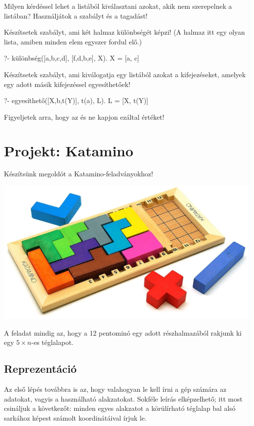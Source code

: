 \begin{problem}
Milyen kérdéssel lehet a  listából
kiválasztani azokat, akik nem szerepelnek a
 listában? Használjátok a
 szabályt és a tagadást!
\end{problem}
\begin{problem}
Készítsetek szabályt, ami két halmaz különbségét
képzi! (A halmaz itt egy olyan lista, amiben minden
elem egyszer fordul elő.)
\begin{query}
?- különbség([a,b,c,d], [f,d,b,e], X).
X = [a, c]
\end{query}
\end{problem}
\begin{problem}
Készítsetek szabályt, ami kiválogatja egy listából
azokat a kifejezéseket, amelyek egy adott másik
kifejezéssel egyesíthetőek!
\begin{query}
?- egyesíthető([X,b,t(Y)], t(a), L).
L = [X, t(Y)]
\end{query}
Figyeljetek arra, hogy az  és  ne kapjon
ezáltal értéket!
\end{problem}

\section{Projekt: Katamino}
Készítsünk megoldót a Katamino-feladványokhoz!

\begin{center}
\includegraphics[width=\textwidth]{images/katamino.jpg}
\end{center}

A feladat mindig az, hogy a 12 pentominó egy adott
részhalmazából rakjunk ki egy $5\times n$-es
téglalapot.

\subsection*{Reprezentáció}
Az első lépés továbbra is az, hogy valahogyan le
kell írni a gép számára az adatokat, vagyis a
használható alakzatokat. Sokféle leírás
elképzelhető; itt most csináljuk a következőt:
minden egyes alakzatot a körülírható téglalap bal
alsó sarkához képest számolt koordinátáival írjuk
le.

